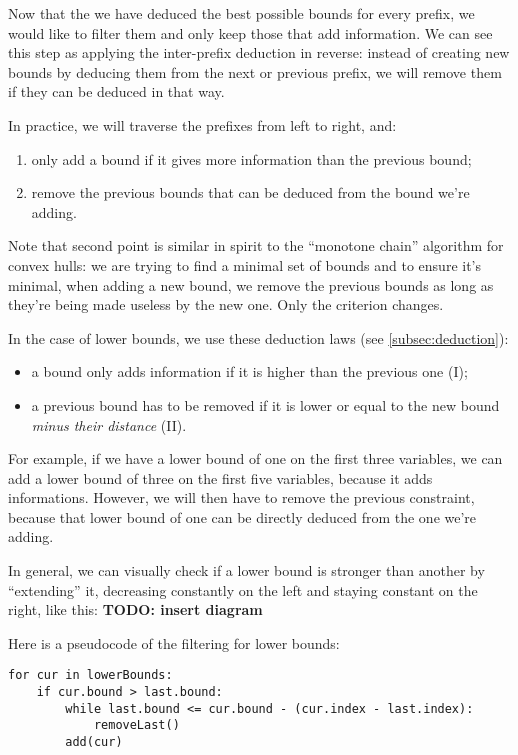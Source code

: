 \documentclass[a4paper,10pt]{article}
\begin{document}
Now that the we have deduced the best possible bounds for every prefix, we would like to filter them and only keep those that add information. We can see this step as applying the inter-prefix deduction in reverse: instead of creating new bounds by deducing them from the next or previous prefix, we will remove them if they can be deduced in that way.

In practice, we will traverse the prefixes from left to right, and:
\begin{enumerate}
    \item only add a bound if it gives more information than the previous bound;
    \item remove the previous bounds that can be deduced from the bound we're adding.
\end{enumerate}

Note that second point is similar in spirit to the ``monotone chain'' algorithm for convex hulls: we are trying to find a minimal set of bounds and to ensure it's minimal, when adding a new bound, we remove the previous bounds as long as they're being made useless by the new one. Only the criterion changes.

In the case of lower bounds, we use these deduction laws (see \ref{subsec:deduction}):
\begin{itemize}
    \item a bound only adds information if it is higher than the previous one (I);
    \item a previous bound has to be removed if it is lower or equal to the new bound \emph{minus their distance} (II).
\end{itemize}

For example, if we have a lower bound of one on the first three variables, we can add a lower bound of three on the first five variables, because it adds informations. However, we will then have to remove the previous constraint, because that lower bound of one can be directly deduced from the one we're adding.

In general, we can visually check if a lower bound is stronger than another by ``extending'' it, decreasing constantly on the left and staying constant on the right, like this: \textbf{TODO: insert diagram}

Here is a pseudocode of the filtering for lower bounds:
\begin{lstlisting}
for cur in lowerBounds:
    if cur.bound > last.bound:
        while last.bound <= cur.bound - (cur.index - last.index):
            removeLast()
        add(cur)
\end{lstlisting}
\end{document}
